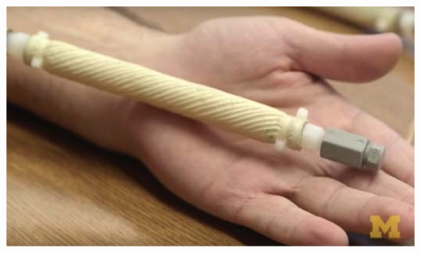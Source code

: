 \documentclass[25pt, a0paper, portrait]{tikzposter}
\begin{document}
{\begin{minipage}[t]{0.16\linewidth}
\begin{tikzfigure}
        \end{tikzfigure}
    \end{minipage} %
    \begin{minipage}[t]{0.21\linewidth}
        \centering
        \begin{tikzfigure}
            \includegraphics[width=\linewidth, height=0.09\textheight]{images/FREEhand.jpg}
        \end{tikzfigure}
    \end{minipage}
}
\end{document}

